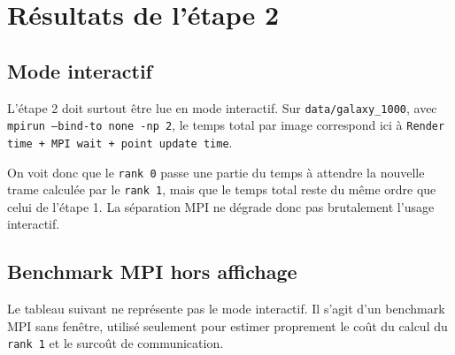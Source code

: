 \section{Résultats de l'étape 2}

\subsection{Mode interactif}

L'étape 2 doit surtout être lue en mode interactif. Sur \texttt{data/galaxy\_1000}, avec \texttt{mpirun --bind-to none -np 2}, le temps total par image correspond ici à \texttt{Render time + MPI wait + point update time}.

\begin{table}[H]
    \centering
    \caption{Résultats du mode interactif pour l'étape 2}
    \label{tab:stage2_interactive}
\end{table}

On voit donc que le \texttt{rank 0} passe une partie du temps à attendre la nouvelle trame calculée par le \texttt{rank 1}, mais que le temps total reste du même ordre que celui de l'étape 1. La séparation MPI ne dégrade donc pas brutalement l'usage interactif.

\subsection{Benchmark MPI hors affichage}

Le tableau suivant ne représente pas le mode interactif. Il s'agit d'un benchmark MPI sans fenêtre, utilisé seulement pour estimer proprement le coût du calcul du \texttt{rank 1} et le surcoût de communication.

